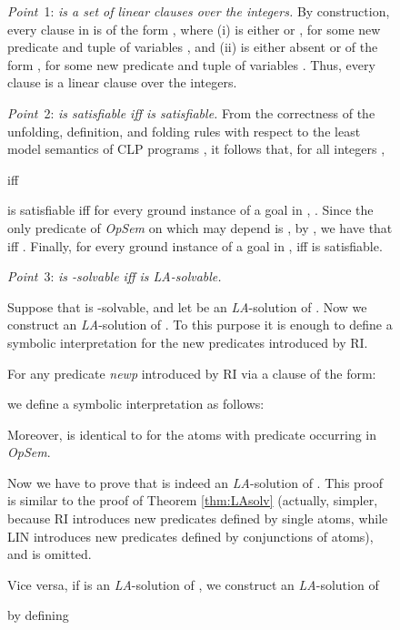 \documentclass[english]{tlp}
\begin{document}
\begin{figure}[ht]
\begin{flushleft}
\begin{minipage}{124mm}
\medskip	
\noindent
{\it Point}~1: {\it  is a set of linear clauses over the integers.}
By construction, every clause in  is of the 
form , where
(i)  is either  or , for some new predicate
 and tuple of variables , and
(ii)  is either absent or of the form , for some new predicate
 and tuple of variables .
Thus, every clause is a linear clause over the integers.
	
\medskip	
\noindent
{\it Point}~2: {\it  is satisfiable iff 
	 is satisfiable.}
From the correctness of the unfolding, definition, and folding rules with respect
to the least model semantics of CLP programs \cite{EtG96}, it follows that,
for all integers ,

 iff 
	 \hfill  ~~~
	
\noindent
 is satisfiable iff 
for every ground instance  of a goal in , .
Since the only predicate of \textit{OpSem} on which  may depend is , by ,
we have that  iff 
.
Finally,  
for every ground instance  of a goal in , iff
 is satisfiable.




\medskip	
\noindent
{\it Point}~3: {\it  is 
	-solvable iff  is {\textit{LA}}-solvable.}

Suppose that  is 
-solvable, and let  be an {\it LA}-solution of 
. 
Now we construct an {\it LA}-solution  of .
To this purpose it is enough to define a symbolic interpretation for
the new predicates introduced by RI.

For any predicate {\it newp} introduced by RI via a clause of the form:

\smallskip



\smallskip

\noindent
we define a symbolic interpretation as follows:

\smallskip



\smallskip

\noindent
Moreover,  is identical to  for the atoms with
predicate occurring in \textit{OpSem}.

Now we have to prove that  is indeed an
{\it LA}-solution of . This proof is similar to
the proof of Theorem \ref{thm:LAsolv} (actually, simpler, because RI
introduces new predicates defined by single atoms, while LIN introduces
new predicates defined by conjunctions of atoms), and is omitted.

Vice versa, if  is an {\it LA}-solution
of ,
we construct an {\it LA}-solution  of 
 
by defining


\end{minipage}
\end{flushleft}
\end{figure}
\end{document}
